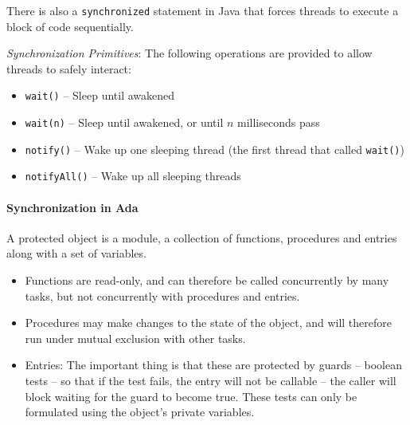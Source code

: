 There is also a \verb|synchronized| statement in Java that forces threads to execute a block of code sequentially.

\textit{Synchronization Primitives}:
The following operations are provided to allow threads to safely interact:
\begin{itemize}[nolistsep,noitemsep]
  \item \verb|wait()| -- Sleep until awakened
  \item\verb|wait(n)| -- Sleep until awakened, or until $n$ milliseconds pass
  \item\verb|notify()| -- Wake up one sleeping thread (the first thread that called \verb|wait()|)
  \item \verb|notifyAll()| -- Wake up all sleeping threads
\end{itemize}

\paragraph{Synchronization in Ada} A protected object is a module, a collection of functions, procedures and entries along with a set of variables.
\begin{itemize}[nolistsep,noitemsep]
  \item Functions are read-only, and can therefore be called concurrently by many tasks, but not concurrently with procedures and entries.
  \item Procedures may make changes to the state of the object, and will therefore run under mutual exclusion with other tasks.
  \item Entries: The important thing is that these are protected by guards -- boolean tests -- so that if the test fails, the entry will not be callable -- the caller will block waiting for the guard to become true. These tests can only be formulated using the object's private variables.
\end{itemize}

